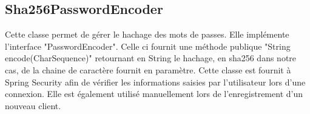 		\subsection{Sha256PasswordEncoder}

			Cette classe permet de gérer le hachage des mots de passes. Elle implémente l'interface "PasswordEncoder". Celle ci fournit une méthode publique "String encode(CharSequence)" retournant en String le hachage, en sha256 dans notre cas, de la chaine de caractère fournit en paramètre. Cette classe est fournit à Spring Security afin de vérifier les informations saisies par l'utilisateur lors d'une connexion. Elle est également utilisé manuellement lors de l'enregistrement d'un nouveau client.

